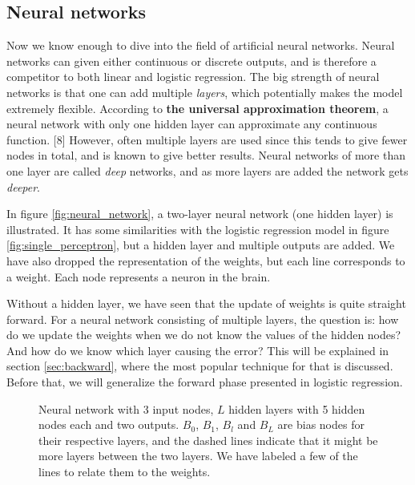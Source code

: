 \subsection{Neural networks} \label{sec:neural_network}
Now we know enough to dive into the field of artificial neural networks. Neural networks can given either continuous or discrete outputs, and is therefore a competitor to both linear and logistic regression. The big strength of neural networks is that one can add multiple \textit{layers}, which potentially makes the model extremely flexible. According to \textbf{the universal approximation theorem}, a neural network with only one hidden layer can approximate any continuous function. [8] However, often multiple layers are used since this tends to give fewer nodes in total, and is known to give better results. Neural networks of more than one layer are called \textit{deep} networks, and as more layers are added the network gets \textit{deeper}.

In figure \eqref{fig:neural_network}, a two-layer neural network (one hidden layer) is illustrated. It has some similarities with the logistic regression model in figure \eqref{fig:single_perceptron}, but a hidden layer and multiple outputs are added. We have also dropped the representation of the weights, but each line corresponds to a weight. Each node represents a neuron in the brain.

Without a hidden layer, we have seen that the update of weights is quite straight forward. For a neural network consisting of multiple layers, the question is: how do we update the weights when we do not know the values of the hidden nodes? And how do we know which layer causing the error? This will be explained in section \ref{sec:backward}, where the most popular technique for that is discussed. Before that, we will generalize the forward phase presented in logistic regression.

\begin{figure}
	\centering
	
	\caption{Neural network with 3 input nodes, $L$ hidden layers with 5 hidden nodes each and two outputs. $B_0$, $B_1$, $B_l$ and $B_L$ are bias nodes for their respective layers, and the dashed lines indicate that it might be more layers between the two layers. We have labeled a few of the lines to relate them to the weights. }
	\label{fig:neural_network}
\end{figure}

